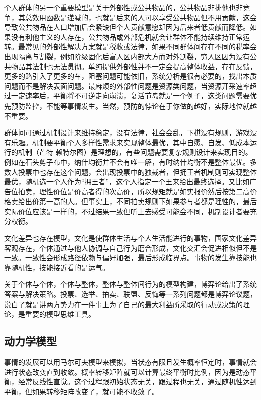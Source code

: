 \documentclass[]{tufte-book}
\begin{document}
个人群体的另一个重要模型是关于外部性或公共物品的，公共物品非排他也非竞争，其总效用函数是递减的，也就是后来的人可以享受公共物品但不用贡献，这会导致公共物品在人口增加后会紧缺但个人贡献意愿却因为后来者低贡献而降低。如果没有利他主义的人存在，公共物品或外部危机就会让群体不能持续维持正常运转。最常见的外部性解决方案就是税收或法律，如果不同群体间存在不同的税率会出现隔离与割裂，例如阶级固化后富人区内部大方而对外割裂，穷人区因为没有公共物品其法制也无法贯彻。单纯提供外部性并不一定会提高整体收益，存在反馈，更多的路引入了更多的车，阻塞问题可能依旧，系统分析是很有必要的，找出本质问题而不是解决表面问题。最麻烦的外部性问题是资源类问题，当资源开采速率超过一定速率后，平衡将不可逆走向崩溃，复活节岛就是一个例子，这类问题需要优先预防监控，不能等事情发生。当然，预防的悖论在于你做的越好，实际地位就越不重要。

群体间可通过机制设计来维持稳定，没有法律，社会会乱，下棋没有规则，游戏没有乐趣。机制要平衡个人多样性需求来实现整体最优，其中自愿、自发、低成本运行的机制（芒特-赖特尔图）是理想的，有些问题需要复杂规则设计来实现目的。例如在石头剪子布中，纳什均衡并不会有唯一解，有时纳什均衡不是整体最优。多数人投票中也存在这个问题，会出现投票中的独裁者，但拥王者机制则可实现整体最优，随机选一个人作为``拥王者''，这个人指定一个王来给出最终选择。又比如广告位拍卖，理性价位是价高者得的次高价，所以规矩就是如实报价然后按第二高价格卖给出价第一高的人。但事实上，不同拍卖规则下如果参与者都是理性的，最后实际价位应该是一样的，不过结果一致但听上去感受可能会不同，机制设计者要充分权衡。

文化差异也存在模型，文化是使群体生活与个人生活能进行的事物，国家文化差异客观存在，个体通过与他人协调与自己行为磨合形成，文化交汇会促进相似但不是一致。一致性会形成路径依赖与偏好加强，最后形成临界点。事物的发生靠技能也靠随机性，技能接近看的是运气。

关于个体与个体，个体与整体，整体与整体间行为的模型构建，博弈论给出了系统答案与解决策略。投票、选举、拍卖、联盟、反悔等一系列问题都是博弈论议题，说白了就是讲两方势力在一件事上为了自己的最大利益所采取的行动或决策的理论，是重要的模型思维工具。

\hypertarget{ux52a8ux529bux5b66ux6a21ux578b}{%
\subsection{动力学模型}\label{ux52a8ux529bux5b66ux6a21ux578b}}

事情的发展可以用马尔可夫模型来模拟，当状态有限且发生概率恒定时，事情就会进行状态改变直到收敛。概率转移矩阵就可以计算最终平衡时比例，因为是动态平衡，经常反线性直觉。这个过程跟初始状态无关，跟过程也无关，通过随机性达到平衡，但如果转移矩阵改变了，就可能不收敛了。
\end{document}

